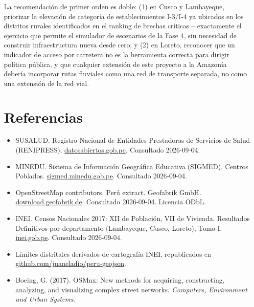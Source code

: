 \documentclass[11pt]{article}
\begin{document}
La recomendación de primer orden es doble: (1) en Cusco y Lambayeque,
priorizar la elevación de categoría de establecimientos I-3/I-4 ya
ubicados en los distritos rurales identificados en el ranking de brechas
críticas -- exactamente el ejercicio que permite el simulador de
escenarios de la Fase 4, sin necesidad de construir infraestructura nueva
desde cero; y (2) en Loreto, reconocer que un indicador de acceso por
carretera no es la herramienta correcta para dirigir política pública, y
que cualquier extensión de este proyecto a la Amazonía debería incorporar
rutas fluviales como una red de transporte separada, no como una extensión
de la red vial.

\section{Referencias}

\begin{itemize}
  \item SUSALUD. Registro Nacional de Entidades Prestadoras de Servicios
  de Salud (RENIPRESS). \url{datosabiertos.gob.pe}. Consultado 2026-09-04.
  \item MINEDU. Sistema de Información Geográfica Educativa (SIGMED),
  Centros Poblados. \url{sigmed.minedu.gob.pe}. Consultado 2026-09-04.
  \item OpenStreetMap contributors. Perú extract. Geofabrik GmbH.
  \url{download.geofabrik.de}. Consultado 2026-09-04. Licencia ODbL.
  \item INEI. Censos Nacionales 2017: XII de Población, VII de Vivienda.
  Resultados Definitivos por departamento (Lambayeque, Cusco, Loreto),
  Tomo I. \url{inei.gob.pe}. Consultado 2026-09-04.
  \item Límites distritales derivados de cartografía INEI, republicados en
  \url{github.com/juaneladio/peru-geojson}.
  \item Boeing, G. (2017). OSMnx: New methods for acquiring, constructing,
  analyzing, and visualizing complex street networks. \emph{Computers,
  Environment and Urban Systems}.
\end{itemize}
\end{document}
